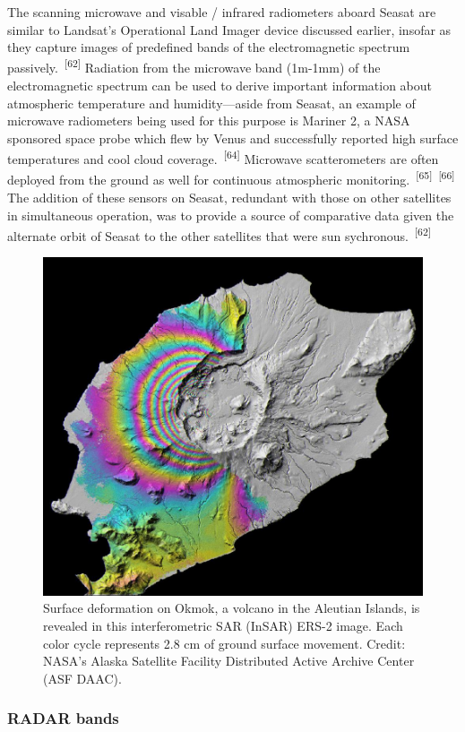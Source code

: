 \documentclass{article}
\begin{document}

\par{The scanning microwave and visable / infrared radiometers aboard Seasat are similar to Landsat's Operational Land Imager device discussed earlier, insofar as they capture images of predefined bands of the electromagnetic spectrum passively.~\textsuperscript{[62]} Radiation from the microwave band (1m-1mm) of the electromagnetic spectrum can be used to derive important information about atmospheric temperature and humidity---aside from Seasat, an example of microwave radiometers being used for this purpose is Mariner 2, a NASA sponsored space probe which flew by Venus and successfully reported high surface temperatures and cool cloud coverage.~\textsuperscript{[64]} Microwave scatterometers are often deployed from the ground as well for continuous atmospheric monitoring.~\textsuperscript{[65]}~\textsuperscript{[66]} The addition of these sensors on Seasat, redundant with those on other satellites in simultaneous operation, was to provide a source of comparative data given the alternate orbit of Seasat to the other satellites that were sun sychronous.~\textsuperscript{[62]}}


\begin{figure}
    \centering
    \includegraphics[width=0.5\linewidth]{images/sar-interferometry-okmok-volcano.jpg}
    \caption{Surface deformation on Okmok, a volcano in the Aleutian Islands, is revealed in this interferometric SAR (InSAR) ERS-2 image. Each color cycle represents 2.8 cm of ground surface movement. Credit: NASA’s Alaska Satellite Facility Distributed Active Archive Center (ASF DAAC).}
    \label{figure18}
\end{figure}

\subsubsection{RADAR bands}
\end{document}
